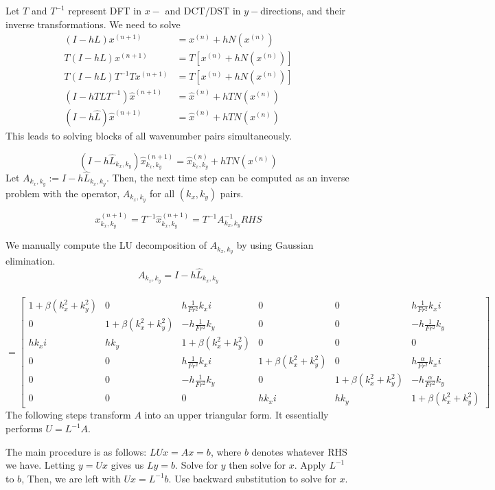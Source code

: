 \documentclass[10pt]{article}
\begin{document}
Let $T$ and $T^{-1}$ represent DFT in $x-$ and DCT/DST in $y-$directions, and their inverse transformations.
We need to solve
\begin{align*}
(I-h L)x^{(n+1)} &= x^{(n)} + h N(x^{(n)})\\
T(I-h L)x^{(n+1)} &= T\left[x^{(n)} + h N(x^{(n)})\right]\\
T(I-h L)T^{-1}T x^{(n+1)} &= T\left[x^{(n)} + h N(x^{(n)})\right]\\
(I-h TLT^{-1})\hat{x}^{(n+1)} &= \hat{x}^{(n)} + h TN(x^{(n)})\\
(I-h \hat{L})\hat{x}^{(n+1)}  &=\hat{x}^{(n)} + h TN(x^{(n)})
\end{align*}
This leads to solving blocks of all wavenumber pairs simultaneously.

$$
(I-h \hat{L}_{k_x,k_y})\hat{x}_{k_x,k_y}^{(n+1)}  =\hat{x}_{k_x,k_y}^{(n)} + h TN(x^{(n)})
$$
Let $A_{k_x, k_y} := I -  h \hat{L}_{k_x, k_y}$.
Then, the next time step can be computed as an inverse problem with the operator, $A_{k_x,k_y}$ for all $(k_x,k_y)$ pairs.

$$
x_{k_x,k_y}^{(n+1)} = T^{-1}\hat{x}_{k_x,k_y}^{(n+1)} = T^{-1} A_{k_x, k_y}^{-1} RHS
$$

We manually compute the LU decomposition of $A_{k_x, k_y}$ by using Gaussian elimination. 
\[A_{k_x, k_y} = I -  h \hat{L}_{k_x, k_y}\]\\
\[= \begin{bmatrix}
1+\beta(k_x^2+k_y^2) & 0 & h\frac{1}{Fr^2}k_xi & 0 & 0 & h\frac{1}{Fr^2}k_xi \\
0 & 1+\beta(k_x^2+k_y^2)  & -h\frac{1}{Fr^2}k_y & 0 & 0 & -h\frac{1}{Fr^2}k_y\\
hk_xi & hk_y & 1+\beta(k_x^2+k_y^2)  & 0 & 0 & 0 \\ 
0 & 0 & h\frac{1}{Fr^2}k_xi & 1+\beta(k_x^2+k_y^2)  & 0 &  h\frac{\alpha}{Fr^2}k_xi \\
0 & 0 & -h\frac{1}{Fr^2}k_y & 0  & 1+\beta(k_x^2+k_y^2)  &  -h\frac{\alpha}{Fr^2}k_y \\
0 & 0 & 0 & hk_xi & hk_y & 1+\beta(k_x^2+k_y^2) 
\end{bmatrix}\]
The following steps transform $A$ into an upper triangular form. It essentially performs $U = L^{-1}A$.

The main procedure is as follows:
$LUx = Ax = b$, where $b$ denotes whatever RHS we have.
Letting $y = Ux$ gives us $Ly = b$. 
Solve for $y$ then solve for $x$.
Apply $L^{-1}$ to $b$, Then, we are left with $Ux = L^{-1}b$.
Use backward substitution to solve for $x$.
\end{document}
